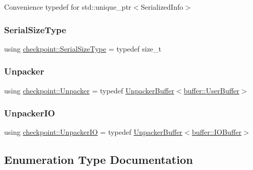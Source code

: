 Convenience typedef for {\ttfamily std\+::unique\+\_\+ptr$<$\+Serialized\+Info$>$} 

\mbox{\label{namespacecheckpoint_a083f6674da3f94c2901b18c6d238217c}} 
\subsubsection{\texorpdfstring{Serial\+Size\+Type}{SerialSizeType}}
{\footnotesize\ttfamily using \hyperlink{namespacecheckpoint_a083f6674da3f94c2901b18c6d238217c}{checkpoint\+::\+Serial\+Size\+Type} = typedef size\+\_\+t}

\mbox{\label{namespacecheckpoint_af36cfec8b3ef7476bb97b3b12908370d}} 
\subsubsection{\texorpdfstring{Unpacker}{Unpacker}}
{\footnotesize\ttfamily using \hyperlink{namespacecheckpoint_af36cfec8b3ef7476bb97b3b12908370d}{checkpoint\+::\+Unpacker} = typedef \hyperlink{structcheckpoint_1_1_unpacker_buffer}{Unpacker\+Buffer}$<$\hyperlink{structcheckpoint_1_1buffer_1_1_user_buffer}{buffer\+::\+User\+Buffer}$>$}

\mbox{\label{namespacecheckpoint_a0efc06d99dce79e452b9d1b503059a74}} 
\subsubsection{\texorpdfstring{Unpacker\+IO}{UnpackerIO}}
{\footnotesize\ttfamily using \hyperlink{namespacecheckpoint_a0efc06d99dce79e452b9d1b503059a74}{checkpoint\+::\+Unpacker\+IO} = typedef \hyperlink{structcheckpoint_1_1_unpacker_buffer}{Unpacker\+Buffer}$<$\hyperlink{structcheckpoint_1_1buffer_1_1_i_o_buffer}{buffer\+::\+I\+O\+Buffer}$>$}



\subsection{Enumeration Type Documentation}
\mbox{\label{namespacecheckpoint_ae2509499ccd8b1dc48fb535bf8aa3059}} 
